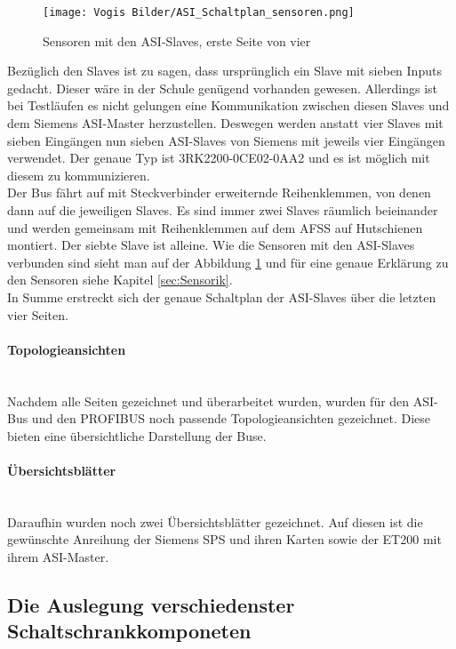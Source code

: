     \begin{figure}[h]
        \centering
        \texttt{[image: Vogis Bilder/ASI\_Schaltplan\_sensoren.png]}
        \caption{Sensoren mit den ASI-Slaves, erste Seite von vier}
        \label{fig:ASI_Sensoren}
    \end{figure}
    Bezüglich den Slaves ist zu sagen, dass ursprünglich ein Slave mit sieben Inputs gedacht. Dieser wäre in der Schule genügend vorhanden gewesen. Allerdings ist bei Testläufen es nicht gelungen eine Kommunikation zwischen diesen Slaves und dem Siemens ASI-Master herzustellen. Deswegen werden anstatt vier Slaves mit sieben Eingängen nun sieben ASI-Slaves von Siemens mit jeweils vier Eingängen verwendet. Der genaue Typ ist 3RK2200-0CE02-0AA2 und es ist möglich mit diesem zu kommunizieren.\\
    Der Bus fährt auf mit Steckverbinder erweiternde Reihenklemmen, von denen dann auf die jeweiligen Slaves. Es sind immer zwei Slaves räumlich beieinander und werden gemeinsam mit Reihenklemmen auf dem AFSS auf Hutschienen montiert. Der siebte Slave ist alleine. Wie die Sensoren mit den ASI-Slaves verbunden sind sieht man auf der Abbildung \ref{fig:ASI_Sensoren} und für eine genaue Erklärung zu den Sensoren siehe Kapitel \ref{sec:Sensorik}.\\
    In Summe erstreckt sich der genaue Schaltplan der ASI-Slaves über die letzten vier Seiten.
    \paragraph{Topologieansichten}\mbox{}\\
    Nachdem alle Seiten gezeichnet und überarbeitet wurden, wurden für den ASI-Bus und den PROFIBUS noch passende Topologieansichten gezeichnet. Diese bieten eine übersichtliche Darstellung der Buse.
    \paragraph{Übersichtsblätter}\mbox{}\\
    Daraufhin wurden noch zwei Übersichtsblätter gezeichnet. Auf diesen ist die gewünschte Anreihung der Siemens SPS und ihren Karten sowie der ET200 mit ihrem ASI-Master.
\subsection{Die Auslegung verschiedenster Schaltschrankkomponeten}
